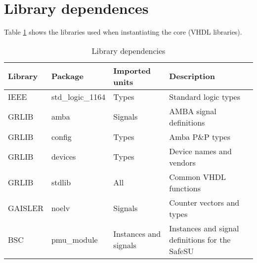 \section{Library dependences}
Table \ref{dep_tab} shows the libraries used when instantiating the core (VHDL libraries).\\
\begin{table}[H]
	\caption{Library dependencies}
	\label{dep_tab}
	\centering
	\begin{tabular}{|l|l|l|l|}
		\hline
		\textbf{Library} & \textbf{Package}  & \textbf{Imported units}  & \textbf{Description} \\
		\hline
		IEEE & std\_logic\_1164 & Types & Standard logic types\\
		\hline
		GRLIB & amba & Signals & AMBA signal definitions\\
		\hline
		GRLIB & config & Types & Amba P\&P types\\
		\hline
		GRLIB & devices  & Types  & Device names and vendors \\
		\hline
		GRLIB & stdlib &  All & Common VHDL functions\\
		\hline
		GAISLER & noelv & Signals & Counter vectors and types \\
		\hline
		BSC & pmu\_module & Instances and signals & Instances and signal definitions for the SafeSU\\
		\hline
	\end{tabular}
\end{table}
